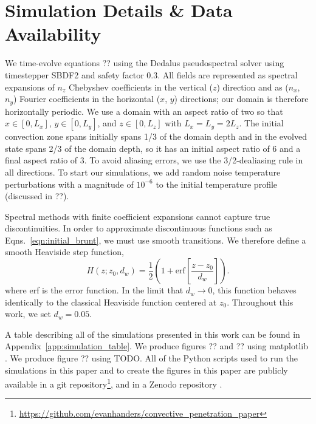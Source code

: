 \section{Simulation Details \& Data Availability}
\label{app:simulation_details}
We time-evolve equations ?? using the Dedalus pseudospectral solver \citep{burns_etal_2020} using timestepper SBDF2 \citep{wang_ruuth_2008} and safety factor 0.3.
All fields are represented as spectral expansions of $n_z$ Chebyshev coefficients in the vertical ($z$) direction and as ($n_x$, $n_y$) Fourier coefficients in the horizontal ($x$, $y$) directions; our domain is therefore horizontally periodic.
We use a domain with an aspect ratio of two so that $x \in [0, L_x]$, $y \in [0, L_y]$, and $z \in [0, L_z]$ with $L_x = L_y = 2L_z$.
The initial convection zone spans initially spans 1/3 of the domain depth and in the evolved state spans 2/3 of the domain depth, so it has an initial aspect ratio of 6 and a final aspect ratio of 3.
To avoid aliasing errors, we use the 3/2-dealiasing rule in all directions.
To start our simulations, we add random noise temperature perturbations with a magnitude of $10^{-6}$ to the initial temperature profile (discussed in ??).

Spectral methods with finite coefficient expansions cannot capture true discontinuities.
In order to approximate discontinuous functions such as Eqns.~\ref{eqn:initial_brunt}, we must use smooth transitions.
We therefore define a smooth Heaviside step function,
\begin{equation}
H(z; z_0, d_w) = \frac{1}{2}\left(1 + \mathrm{erf}\left[\frac{z - z_0}{d_w}\right]\right).
\label{eqn:heaviside}
\end{equation}
where erf is the error function.
In the limit that $d_w \rightarrow 0$, this function behaves identically to the classical Heaviside function centered at $z_0$.
Throughout this work, we set $d_w = 0.05$.

A table describing all of the simulations presented in this work can be found in Appendix~\ref{app:simulation_table}.
We produce figures ?? and ?? using matplotlib \citep{hunter2007, mpl3.3.4}.
We produce figure ?? using TODO.
All of the Python scripts used to run the simulations in this paper and to create the figures in this paper are publicly available in a git repository\footnote{\url{https://github.com/evanhanders/convective_penetration_paper}}, and in a Zenodo repository \citep{supp}.
